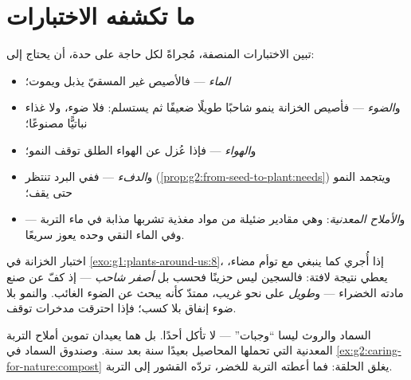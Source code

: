 \section{ما تكشفه الاختبارات}

\begin{proposition}\label{prop:g4:what-plants-need:needs}
تبين الاختبارات المنصفة، مُجراةً لكل حاجة على حدة، أن  يحتاج إلى:
\begin{itemize}
  \item \emph{الماء} --- فالأصيص غير المسقيّ يذبل ويموت؛
  \item و\emph{الضوء} --- فأصيص الخزانة ينمو شاحبًا طويلًا ضعيفًا
        ثم يستسلم: فلا ضوء، ولا غذاء نباتيًّا مصنوعًا؛
  \item و\emph{الهواء} --- فإذا عُزل عن الهواء الطلق توقف النمو؛
  \item و\emph{الدفء} --- ففي البرد تنتظر 
        (\cref{prop:g2:from-seed-to-plant:needs}) ويتجمد النمو حتى
        يقف؛
  \item و\emph{الأملاح المعدنية}: وهي مقادير
        ضئيلة من مواد مغذية تشربها  مذابة في ماء التربة ---
        وفي الماء النقي وحده يعوز  سريعًا.
\end{itemize}
\end{proposition}
\admitted

\begin{example}\label{ex:g4:what-plants-need:pale}
اختبار الخزانة في \cref{exo:g1:plants-around-us:8}، إذا أُجري
كما ينبغي مع توأم مضاء، يعطي نتيجة لافتة: فالسجين ليس حزينًا
فحسب بل \emph{أصفر شاحب} --- إذ كفّ عن صنع مادته الخضراء ---
و\emph{طويل} على نحو غريب، ممتدّ كأنه يبحث عن الضوء الغائب. والنمو
بلا ضوء إنفاق بلا كسب؛ فإذا احترقت مدخرات  توقف.
\end{example}

\begin{remark}\label{rem:g4:what-plants-need:soil}
السماد والروث ليسا ``وجبات''  ---  لا تأكل أحدًا.
بل هما يعيدان تموين أملاح التربة المعدنية التي تحملها المحاصيل
بعيدًا سنة بعد سنة. وصندوق السماد في
\cref{ex:g2:caring-for-nature:compost} يغلق الحلقة: فما أعطته
التربة للخضر، تردّه القشور إلى التربة.
\end{remark}

